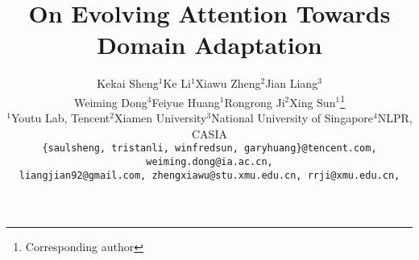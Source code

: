 \documentclass[10pt,twocolumn,letterpaper]{article}
\begin{document}
\title{On Evolving Attention Towards Domain Adaptation}

\author{Kekai Sheng$^{1}$\quad Ke Li$^{1}$\quad Xiawu Zheng$^{2}$\quad Jian Liang$^{3}$\\ Weiming Dong$^{4}$\quad Feiyue Huang$^{1}$\quad Rongrong Ji$^{2}$\quad Xing Sun$^{1}$\thanks{Corresponding author} \\
$^1$Youtu Lab, Tencent\quad $^2$Xiamen University\quad $^3$National University of Singapore\quad $^4$NLPR, CASIA \\
{\tt\small \{saulsheng, tristanli, winfredsun, garyhuang\}@tencent.com, weiming.dong@ia.ac.cn,} \\ {\tt\small liangjian92@gmail.com, zhengxiawu@stu.xmu.edu.cn, rrji@xmu.edu.cn,}
}

\maketitle
\ificcvfinal\thispagestyle{empty}\fi

\newcommand{\iMethod}{EvoADA}

\newcommand{\SOTA}{\textit{state-of-the-art}~}

\newcommand{\Sdomain}{\mathcal{S}}
\newcommand{\Tdomain}{\mathcal{T}}
\newcommand{\Sdata}{x^{\mathcal{S}}}
\newcommand{\Slabel}{y^{\mathcal{S}}}
\newcommand{\Snum}{N^{\mathcal{S}}}
\newcommand{\Tdata}{x^{\mathcal{T}}}
\newcommand{\Tnum}{N^{\mathcal{T}}}

\newcommand{\sspace}{\mathcal{A}}

\newcommand{\seed}{\mathcal{G}_{seed}}
\newcommand{\randseed}{\mathcal{G}_{rand}}
\newcommand{\crossover}{\mathcal{G}_{crossover}}
\newcommand{\mutate}{\mathcal{G}_{mutate}}
\newcommand{\best}{\mathcal{G}_{best}}

\newcommand{\RNum}[1]{\uppercase\expandafter{\romannumeral #1\relax}}
\end{document}
